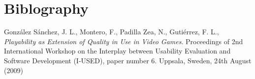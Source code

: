 \section{Biblography}

\begin{thebibliography}{9}

  González Sánchez, J. L., Montero, F., Padilla Zea, N., Gutiérrez, F. L.,
  \emph{Playability as Extension of Quality in Use in Video Games}.
  Proceedings of 2nd International Workshop on the Interplay between
  Usability Evaluation and Software Development (I-USED), paper number 6.
  Uppsala, Sweden,
  24th August (2009)

\end{thebibliography}
